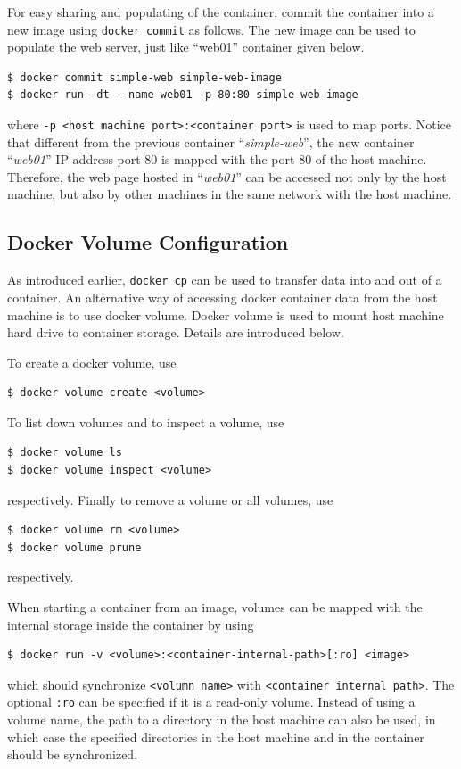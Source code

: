 For easy sharing and populating of the container, commit the container into a new image using \verb|docker commit| as follows. The new image can be used to populate the web server, just like ``web01'' container given below.
\begin{lstlisting}
$ docker commit simple-web simple-web-image
$ docker run -dt --name web01 -p 80:80 simple-web-image
\end{lstlisting}
where \verb|-p <host machine port>:<container port>| is used to map ports. Notice that different from the previous container ``\textit{simple-web}'', the new container ``\textit{web01}'' IP address port 80 is mapped with the port 80 of the host machine. Therefore, the web page hosted in ``\textit{web01}'' can be accessed not only by the host machine, but also by other machines in the same network with the host machine.

\subsection{Docker Volume Configuration} \label{ch:vac:subsec:dockervolume}

As introduced earlier, \verb|docker cp| can be used to transfer data into and out of a container. An alternative way of accessing docker container data from the host machine is to use docker volume. Docker volume is used to mount host machine hard drive to container storage. Details are introduced below.

To create a docker volume, use
\begin{lstlisting}
$ docker volume create <volume>
\end{lstlisting}
To list down volumes and to inspect a volume, use
\begin{lstlisting}
$ docker volume ls
$ docker volume inspect <volume>
\end{lstlisting}
respectively. Finally to remove a volume or all volumes, use
\begin{lstlisting}
$ docker volume rm <volume>
$ docker volume prune
\end{lstlisting}
respectively.

When starting a container from an image, volumes can be mapped with the internal storage inside the container by using
\begin{lstlisting}
$ docker run -v <volume>:<container-internal-path>[:ro] <image>
\end{lstlisting}
which should synchronize \verb|<volumn name>| with \verb|<container internal path>|. The optional \verb|:ro| can be specified if it is a read-only volume. Instead of using a volume name, the path to a directory in the host machine can also be used, in which case the specified directories in the host machine and in the container should be synchronized.

